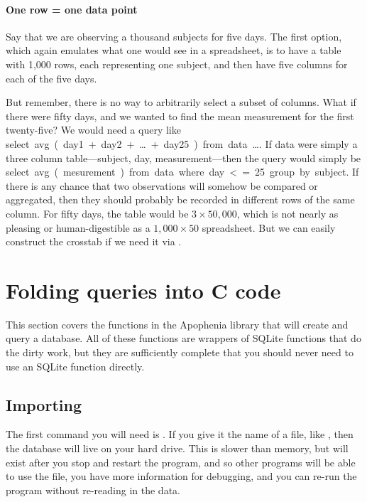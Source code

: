 \paragraph{One row = one data point} Say that we are observing a
thousand subjects for five days. The first option, which again emulates
what one would see in a spreadsheet, is to have a table with 1,000
rows, each representing one subject, and then have five columns for each
of the five days. 

But remember, there is no way to arbitrarily select a subset of columns.
What if there were fifty days, and we wanted to find the mean measurement for the first
twenty-five? We would need a query like \si{select avg(day1 + day2 +
\dots + day25) from data \dots}. If \si{data} were simply a three column table---\si{subject}, \si{day}, \si{measurement}---then the query would simply be
\si{select avg(mesurement) from data where day <=25 group by subject}. If there is any
chance that two observations will somehow be compared or aggregated,
then they should probably be recorded in different rows of the same
column. For fifty days, the table would be $3 \times 50,000$, which
is not nearly as pleasing or human-digestible as a $1,000 \times 50$
spreadsheet. But we can easily construct the crosstab if we need it
via .


\section{Folding queries into C code}\label{foldingsql}  This section
covers the functions in the Apophenia library that will create and query
a database. All of these functions are wrappers of SQLite functions that
do the dirty work, but they are sufficiently complete that you should
never need to use an SQLite function directly.

\subsection{Importing}
The first command you will need is . If you give
it the name of a file, like , then the
database will live on your hard drive. This is slower than memory, but
will exist after you stop and restart the program, and so other programs
will be able to use the file, you have more information for debugging,
and you can re-run the program without re-reading in the data.

